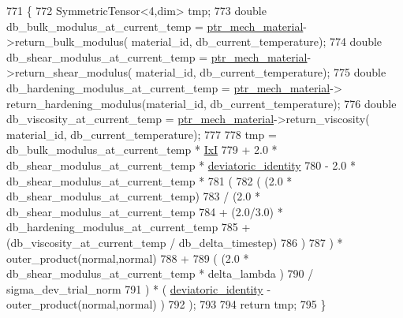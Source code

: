 \begin{DoxyCode}
771     \{
772         SymmetricTensor<4,dim> tmp;
773         \textcolor{keywordtype}{double} db\_bulk\_modulus\_at\_current\_temp = \hyperlink{classConstitutive__Laws_1_1Thermo__Elasto__Plastic_a5a59fd71829d58859a122fe74628a9e4}{ptr\_mech\_material}->return\_bulk\_modulus(
      material\_id, db\_current\_temperature);
774         \textcolor{keywordtype}{double} db\_shear\_modulus\_at\_current\_temp = \hyperlink{classConstitutive__Laws_1_1Thermo__Elasto__Plastic_a5a59fd71829d58859a122fe74628a9e4}{ptr\_mech\_material}->return\_shear\_modulus(
      material\_id, db\_current\_temperature);
775         \textcolor{keywordtype}{double} db\_hardening\_modulus\_at\_current\_temp = \hyperlink{classConstitutive__Laws_1_1Thermo__Elasto__Plastic_a5a59fd71829d58859a122fe74628a9e4}{ptr\_mech\_material}->
      return\_hardening\_modulus(material\_id, db\_current\_temperature);
776         \textcolor{keywordtype}{double} db\_viscosity\_at\_current\_temp = \hyperlink{classConstitutive__Laws_1_1Thermo__Elasto__Plastic_a5a59fd71829d58859a122fe74628a9e4}{ptr\_mech\_material}->return\_viscosity(
      material\_id, db\_current\_temperature);
777 
778         tmp = db\_bulk\_modulus\_at\_current\_temp * \hyperlink{classConstitutive__Laws_1_1Thermo__Elasto__Plastic_a3e093ae5b5ef432f1f4fea14148dd8e1}{IxI}
779               + 2.0  * db\_shear\_modulus\_at\_current\_temp * \hyperlink{classConstitutive__Laws_1_1Thermo__Elasto__Plastic_a5d88bd28aa5b3e74707ebb49de884755}{deviatoric\_identity}
780               - 2.0 * db\_shear\_modulus\_at\_current\_temp *
781                 (
782                         (   (2.0 * db\_shear\_modulus\_at\_current\_temp)
783                             / (2.0 * db\_shear\_modulus\_at\_current\_temp
784                                + (2.0/3.0) * db\_hardening\_modulus\_at\_current\_temp
785                                + (db\_viscosity\_at\_current\_temp / db\_delta\_timestep)
786                             )
787                         ) * outer\_product(normal,normal)
788                         +
789                         (   (2.0 * db\_shear\_modulus\_at\_current\_temp * delta\_lambda )
790                             / sigma\_dev\_trial\_norm
791                         ) * ( \hyperlink{classConstitutive__Laws_1_1Thermo__Elasto__Plastic_a5d88bd28aa5b3e74707ebb49de884755}{deviatoric\_identity} - outer\_product(normal,normal) )
792                 );
793 
794         \textcolor{keywordflow}{return} tmp;
795     \}
\end{DoxyCode}
